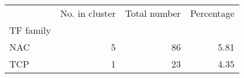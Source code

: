\begin{tabular}{lrrr}
\toprule
{} &  No. in cluster &  Total number &  Percentage \\
TF family &                 &               &             \\
\midrule
NAC       &               5 &            86 &        5.81 \\
TCP       &               1 &            23 &        4.35 \\
\bottomrule
\end{tabular}
